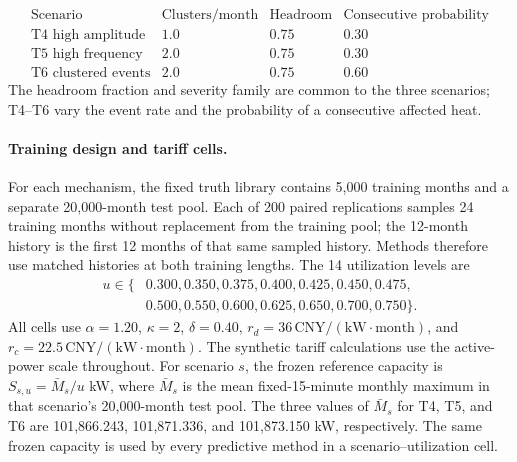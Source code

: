 \documentclass[]{interact}
\begin{document}
\[
\begin{array}{lccc}
\text{Scenario} & \text{Clusters/month} &
\text{Headroom} & \text{Consecutive probability}\\
\text{T4 high amplitude} & 1.0 & 0.75 & 0.30\\
\text{T5 high frequency} & 2.0 & 0.75 & 0.30\\
\text{T6 clustered events} & 2.0 & 0.75 & 0.60
\end{array}
\]
The headroom fraction and severity family are common to the three
scenarios; T4--T6 vary the event rate and the probability of a
consecutive affected heat.

\paragraph*{Training design and tariff cells.}
For each mechanism, the fixed truth library contains 5,000 training
months and a separate 20,000-month test pool. Each of 200 paired
replications samples 24 training months without replacement from the
training pool; the 12-month history is the first 12 months of that
same sampled history. Methods therefore use matched histories at both
training lengths. The 14 utilization levels are
\[
\begin{aligned}u\in\{&0.300,0.350,0.375,0.400,0.425,0.450,0.475,\\
&0.500,0.550,0.600,0.625,0.650,0.700,0.750\}.\end{aligned}
\]
All cells use $\alpha=1.20$, $\kappa=2$, $\delta=0.40$,
$r_d=36\,\mathrm{CNY/(kW\cdot month)}$, and
$r_c=22.5\,\mathrm{CNY/(kW\cdot month)}$. The synthetic tariff
calculations use the active-power scale throughout. For scenario $s$,
the frozen reference capacity is $S_{s,u}=\bar M_s/u$ kW, where
$\bar M_s$ is the mean fixed-15-minute monthly maximum in that
scenario's 20,000-month test pool. The three values of $\bar M_s$ for
T4, T5, and T6 are 101,866.243, 101,871.336, and 101,873.150 kW,
respectively. The same frozen capacity is used by every predictive
method in a scenario--utilization cell.
\end{document}
